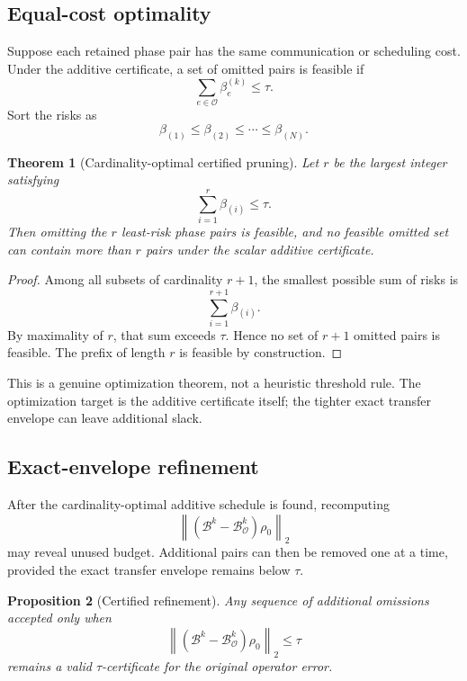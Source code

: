 \documentclass[11pt]{article}
\newtheorem{theorem}{Theorem}[section]
\newtheorem{proposition}[theorem]{Proposition}
\theoremstyle{definition}
\theoremstyle{remark}
\begin{document}
\subsection{Equal-cost optimality}

Suppose each retained phase pair has the same communication or scheduling
cost.  Under the additive certificate, a set of omitted pairs is feasible if
\[
\sum_{e\in\mathcal O}\beta_e^{(k)}\le\tau.
\]
Sort the risks as
\[
\beta_{(1)}\le\beta_{(2)}\le\cdots\le\beta_{(N)}.
\]

\begin{theorem}[Cardinality-optimal certified pruning]
\label{thm:unit-cost-optimal}
Let $r$ be the largest integer satisfying
\[
\sum_{i=1}^{r}\beta_{(i)}\le\tau.
\]
Then omitting the $r$ least-risk phase pairs is feasible, and no feasible
omitted set can contain more than $r$ pairs under the scalar additive
certificate.
\end{theorem}

\begin{proof}
Among all subsets of cardinality $r+1$, the smallest possible sum of risks is
\[
\sum_{i=1}^{r+1}\beta_{(i)}.
\]
By maximality of $r$, that sum exceeds $\tau$.  Hence no set of $r+1$ omitted
pairs is feasible.  The prefix of length $r$ is feasible by construction.
\end{proof}

This is a genuine optimization theorem, not a heuristic threshold rule.  The
optimization target is the additive certificate itself; the tighter exact
transfer envelope can leave additional slack.

\subsection{Exact-envelope refinement}

After the cardinality-optimal additive schedule is found, recomputing
\[
\left\lVert
(\mathcal B^k-\mathcal B_{\mathcal O}^k)\rho_0
\right\rVert_2
\]
may reveal unused budget.  Additional pairs can then be removed one at a time,
provided the exact transfer envelope remains below $\tau$.

\begin{proposition}[Certified refinement]
Any sequence of additional omissions accepted only when
\[
\left\lVert
(\mathcal B^k-\mathcal B_{\mathcal O}^k)\rho_0
\right\rVert_2\le\tau
\]
remains a valid $\tau$-certificate for the original operator error.
\end{proposition}
\end{document}

